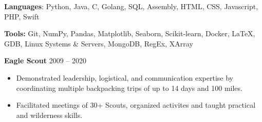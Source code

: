 \documentclass{article}
\begin{document}

    \noindent \textbf{Languages}: Python, Java, C, Golang, SQL, Assembly, HTML, CSS, Javascript, PHP, Swift
    
    \vspace{1mm}

    \noindent \textbf{Tools:} Git, NumPy, Pandas, Matplotlib, Seaborn, Scikit-learn, Docker, \LaTeX, GDB, Linux Systems \& Servers, MongoDB, RegEx, XArray

    
    \noindent \textbf{Eagle Scout} \hfill 2009 -- 2020
    \begin{itemize}
        \item Demonstrated leadership, logistical, and communication expertise by coordinating multiple backpacking trips of up to 14 days and 100 miles.
        \item Facilitated meetings of 30+ Scouts, organized activites and taught practical and wilderness skills.
    \end{itemize}
    
\end{document}
